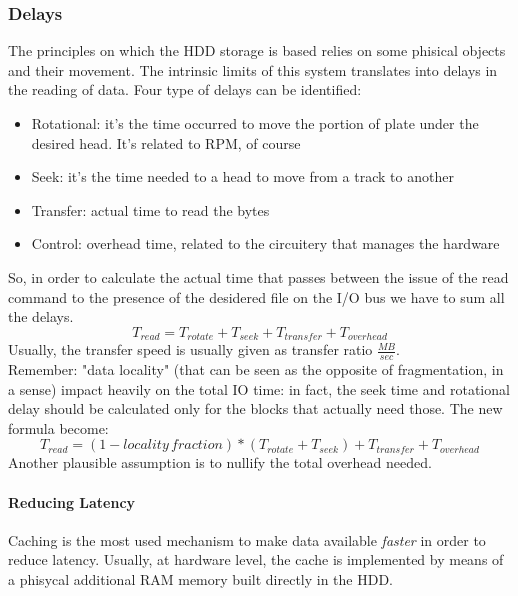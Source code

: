 \documentclass{article}
\begin{document}
				\subsubsection{Delays}
					The principles on which the HDD storage is based relies on some phisical objects and their movement. The intrinsic limits of this system translates into delays in the reading of data. Four type of delays can be identified:
					\begin{itemize}
						\item Rotational: it's the time occurred to move the portion of plate under the desired head. It's related to RPM, of course
						\item Seek: it's the time needed to a head to move from a track to another
						\item Transfer: actual time to read the bytes
						\item Control: overhead time, related to the circuitery that manages the hardware
					\end{itemize}
					
					So, in order to calculate the actual time that passes between the issue of the read command to the presence of the desidered file on the I/O bus we have to sum all the delays.
					\begin{equation}
						T_{read} = T_{rotate} + T_{seek} + T_{transfer} + T_{overhead}
					\end{equation}
					Usually, the transfer speed is usually given as transfer ratio $\frac{MB}{sec}$.\\
					Remember: "data locality" (that can be seen as the opposite of fragmentation, in a sense) impact heavily on the total IO time: in fact, the seek time and rotational delay should be calculated only for the blocks that actually need those. The new formula become:
					\begin{equation}
						T_{read} = (1 - locality\, fraction)*(T_{rotate} + T_{seek}) + T_{transfer} + T_{overhead}
					\end{equation}
					Another plausible assumption is to nullify the total overhead needed.
					
					\paragraph{Reducing Latency}
						Caching is the most used mechanism to make data available \emph{faster} in order to reduce latency. Usually, at hardware level, the cache is implemented by means of a phisycal additional RAM memory built directly in the HDD.
						
\end{document}
